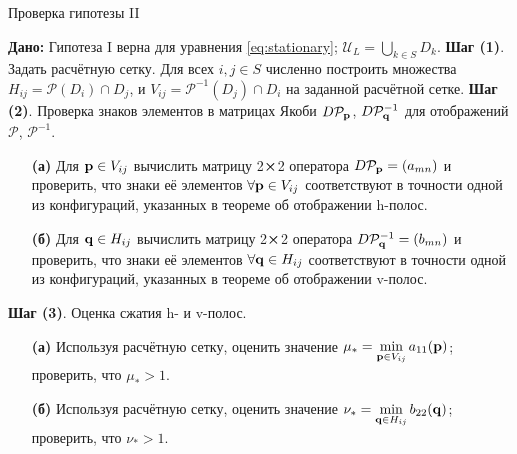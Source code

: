 \documentclass[candidate, href, colorlinks]{disser}
\begin{document}
\begin{algorithm}[H]
\caption{Проверка гипотезы II}
\label{algorithm:hypotheses-validation}
\begin{algorithmic}
	\STATE \textbf{Дано:} Гипотеза I верна для уравнения \eqref{eq:stationary}; $\mathscr{U}_L = \bigcup_{k \in S} D_k$.
	\STATE \textbf{Шаг (1)}. Задать расчётную сетку.
		Для всех $i, j \in S$ численно построить множества $H_{ij} = \mathcal{P}(D_i) \cap D_j$, и $V_{ij} = \mathcal{P}^{-1} (D_j) \cap D_i$ на заданной расчётной сетке.
	\STATE \textbf{Шаг (2)}. Проверка знаков элементов в матрицах Якоби $D \mathcal{P}_{\vb{p}}$, $D \mathcal{P}_{\vb{q}}^{-1}$ для отображений $\mathcal{P}$, $\mathcal{P}^{-1}$.
	\STATE
	\begin{enumerate}
		\setlength{\itemsep}{1pt}
		\setlength{\parskip}{0pt}
  		\setlength{\parsep}{0pt}
		\item[\textbf{(а)}] Для $\vb{p} \in V_{ij}$ вычислить матрицу 2$\cross$2 оператора $D \mathcal{P}_{\vb{p}} = (a_{mn})$ и проверить, что знаки её элементов $\forall \vb{p} \in V_{ij}$ соответствуют в точности одной из конфигураций, указанных в теореме об отображении h-полос.
		\item[\textbf{(б)}] Для $\vb{q} \in H_{ij}$ вычислить матрицу 2$\cross$2 оператора $D \mathcal{P}_{\vb{q}}^{-1} = (b_{mn})$ и проверить, что знаки её элементов $\forall \vb{q} \in H_{ij}$ соответствуют в точности одной из конфигураций, указанных в теореме об отображении v-полос.
	\end{enumerate}
	\STATE \textbf{Шаг (3)}. Оценка сжатия h- и v-полос.
	\STATE
	\begin{enumerate}
		\setlength{\itemsep}{1pt}
		\setlength{\parskip}{0pt}
  		\setlength{\parsep}{0pt}
		\item[\textbf{(а)}] Используя расчётную сетку, оценить значение $\mu_* = \min \limits_{\vb{p} \in V_{ij}} a_{11}(\vb{p})$; проверить, что $\mu_* > 1$.
		\item[\textbf{(б)}] Используя расчётную сетку, оценить значение $\nu_* = \min \limits_{\vb{q} \in H_{ij}} b_{22}(\vb{q})$; проверить, что $\nu_* > 1$.
	\end{enumerate}
\end{algorithmic}
\end{algorithm}
\end{document}
